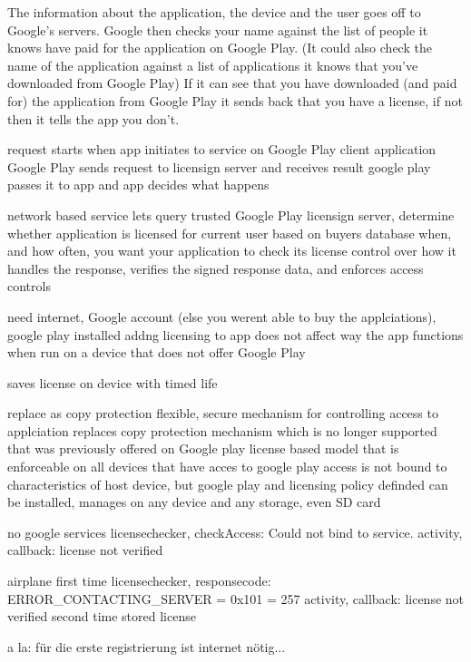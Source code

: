 The information about the application, the device and the user goes off to Google's servers.
Google then checks your name against the list of people it knows have paid for the application on Google Play. (It could also check the name of the application against a list of applications it knows that you've downloaded from Google Play)
If it can see that you have downloaded (and paid for) the application from Google Play it sends back that you have a license, if not then it tells the app you don't.

%
request starts when app initiates to service on Google Play client application
Google Play sends request to licensign server and receives result
google play passes it to app and app decides what happens
\cite{developersLicensingOverview}
%


%
network based service lets query trusted Google Play licensign server, determine whether application is licensed for current user based on buyers database
when, and how often, you want your application to check its license
control over how it handles the response, verifies the signed response data, and enforces access controls

need internet, Google account (else you werent able to buy the applciations), google play installed
addng licensing to app does not affect way the app functions when run on a device that does not offer Google Play

saves license on device with timed life

replace as copy protection
flexible, secure mechanism for controlling access to applciation
replaces copy protection mechanism which is no longer supported that was previously offered on Google play
license based model that is enforceable on all devices that have acces to google play
access is not bound to characteristics of host device, but google play and licensing policy definded
can be installed, manages on any device and any storage, even SD card
\cite{developersLicensingOverview}
%


no google services
licensechecker, checkAccess: Could not bind to service.
activity, callback: license not verified

airplane
first time
licensechecker, responsecode: ERROR\_CONTACTING\_SERVER = 0x101 = 257
activity, callback: license not verified
second time
stored license\cite{developersLicensingAdding}

a la: für die erste registrierung ist internet nötig...
